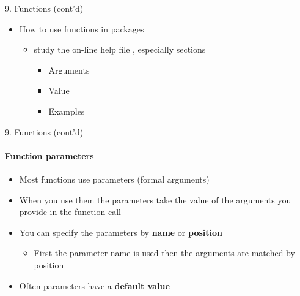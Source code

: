 \documentclass[14pt, aspectratio=169, sectionpage=simple, xclolor=table]{beamer}
\begin{document}
\begin{frame}{9. Functions (cont'd)}
\begin{itemize}
	\item How to use functions in packages
	\begin{itemize}
		\item study the on-line help file , especially sections
		\begin{itemize}
			\item Arguments
			\item Value
			\item Examples
			\nl
		\end{itemize}
	\end{itemize}
\end{itemize}
\end{frame}
\begin{frame}{9. Functions (cont'd)}
\framesubtitle{Function parameters}
\begin{itemize}
  \item Most functions use \alert{parameters} (formal arguments)
  \item When you use them the parameters take the value of the arguments you provide in the function call
  \item You can specify the parameters by \textbf{name}  or \textbf{position} 
  \begin{itemize}
    \item First the parameter name is used then the arguments are matched by position
  \end{itemize} 
\item Often parameters have a \textbf{default value}
\end{itemize}
\end{frame}
\end{document}
